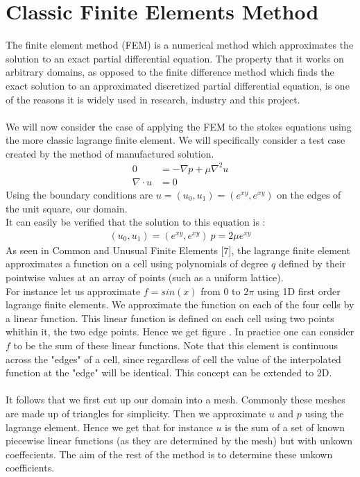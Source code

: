 \documentclass[11pt,twoside,a4paper]{article}
\begin{document}
\section{Classic Finite Elements Method}
The finite element method (FEM) is a numerical method which approximates the solution to an exact partial differential equation. The property that it works on arbitrary domains, as opposed to the finite difference method which finds the exact solution to an approximated discretized partial differential equation, is one of the reasons it is widely used in research, industry and this project.\\
\\
We will now consider the case of applying the FEM to the stokes equations using the more classic lagrange finite element. We will specifically consider a test case created by the method of manufactured solution.\\
\begin{align}
0 &= -\nabla p + \mu \nabla^2 u\\
\nabla \cdot u &= 0
\end{align}
Using the boundary conditions are  $u = (u_0,u_1) = (e^{x y},e^{x y})$ on the edges of the unit square, our domain.\\
It can easily be verified that the solution to this equation is :
\begin{align}
(u_0,u_1) = (e^{x y},e^{x y}) \ p = 2 \mu e^{x y}
\end{align}
As seen in Common and Unusual Finite Elements [7], the lagrange finite element approximates a function on a cell using polynomials of degree $q$ defined by their pointwise values at an array of points (such as a uniform lattice).\\
For instance let us approximate $f = sin(x)$ from $0$ to $2 \pi$ using 1D first order lagrange finite elements. We approximate the function on each of the four cells by a linear function. This linear function is defined on each cell using two points whithin it, the two edge points. Hence we get figure . In practice one can consider $f$ to be the sum of these linear functions. Note that this element is continuous across the "edges" of a cell, since regardless of cell the value of the interpolated function at the "edge" will be identical. This concept can be extended to 2D.\\
\\
It follows that we first cut up our domain into a mesh. Commonly these meshes are made up of triangles for simplicity. Then we approximate $u$ and $p$ using the lagrange element. Hence we get that for instance $u$ is the sum of a set of known piecewise linear functions (as they are determined by the mesh) but with unkown coeffecients. The aim of the rest of the method is to determine these unkown coefficients.\\
\end{document}
